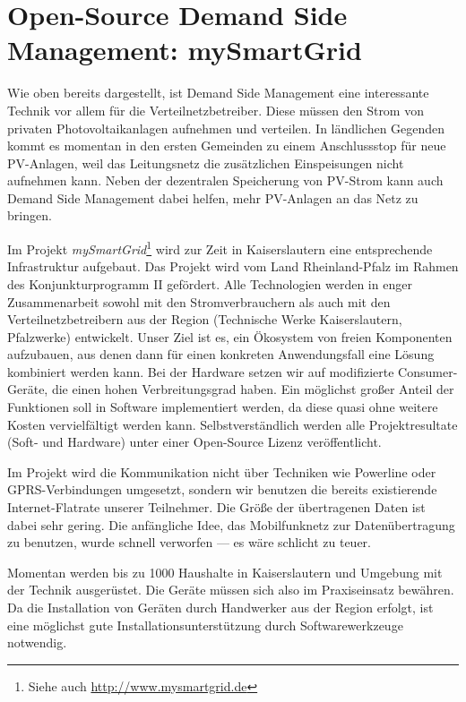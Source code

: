\documentclass[12pt,BCOR=8.5mm]{scrartcl}
\begin{document}
\section{Open-Source Demand Side Management: mySmartGrid}\label{sec:chancen_open-source}

Wie oben bereits dargestellt, ist Demand Side Management eine
interessante Technik vor allem für die Verteilnetzbetreiber. Diese
müssen den Strom von privaten Photovoltaikanlagen aufnehmen und
verteilen. In ländlichen Gegenden kommt es momentan in den ersten Gemeinden zu
einem Anschlussstop für neue PV-Anlagen, weil das Leitungsnetz die
zusätzlichen Einspeisungen nicht aufnehmen kann. Neben der dezentralen
Speicherung von PV-Strom kann auch Demand Side Management dabei helfen,
mehr PV-Anlagen an das Netz zu bringen.

Im Projekt \emph{mySmartGrid}\footnote{Siehe auch
\url{http://www.mysmartgrid.de}} wird zur Zeit in Kaiserslautern eine
entsprechende Infrastruktur aufgebaut. Das Projekt wird vom Land
Rheinland-Pfalz im Rahmen des Konjunkturprogramm II gefördert. Alle
Technologien werden in enger Zusammenarbeit sowohl mit den
Stromverbrauchern als auch mit den Verteilnetzbetreibern aus der Region
(Technische Werke Kaiserslautern, Pfalzwerke) entwickelt.  Unser Ziel
ist es, ein Ökosystem von freien Komponenten aufzubauen, aus denen dann
für einen konkreten Anwendungsfall eine Lösung kombiniert werden kann.
Bei der Hardware setzen wir auf modifizierte
Consumer-Geräte, die einen hohen Verbreitungsgrad haben.  Ein möglichst
großer Anteil der Funktionen soll in Software implementiert werden, da
diese quasi ohne weitere Kosten vervielfältigt werden kann.
Selbstverständlich werden alle Projektresultate (Soft- und Hardware)
unter einer Open-Source Lizenz veröffentlicht. 

Im Projekt wird die Kommunikation nicht über Techniken wie Powerline
oder GPRS-Verbindungen umgesetzt, sondern wir benutzen die bereits
existierende Internet-Flatrate unserer Teilnehmer. Die Größe der
übertragenen Daten ist dabei sehr gering. Die anfängliche Idee,
das Mobilfunknetz zur Datenübertragung zu benutzen, wurde schnell
verworfen --- es wäre schlicht zu teuer.

Momentan werden bis zu 1000 Haushalte in Kaiserslautern und Umgebung
mit der Technik ausgerüstet. Die Geräte müssen sich also im
Praxiseinsatz bewähren. Da die Installation von Geräten durch
Handwerker aus der Region erfolgt, ist eine möglichst gute
Installationsunterstützung durch Softwarewerkzeuge notwendig. 
\end{document}
